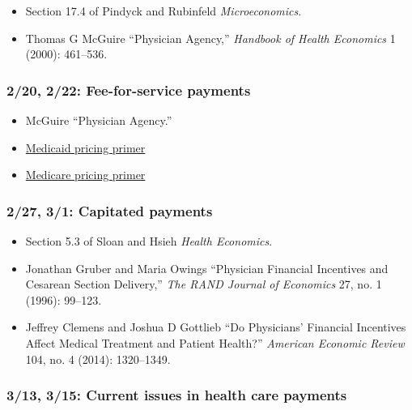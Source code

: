 \documentclass[11pt,]{article}
\providecommand{\tightlist}{%
  \setlength{\itemsep}{0pt}\setlength{\parskip}{0pt}}
\begin{document}
\begin{itemize}
\tightlist
\item
  Section 17.4 of Pindyck and Rubinfeld \emph{Microeconomics}.
\item
  Thomas G McGuire {``Physician Agency,''} \emph{Handbook of Health
  Economics} 1 (2000): 461--536.
\end{itemize}

\hypertarget{fee-for-service-payments}{%
\subsubsection{2/20, 2/22: Fee-for-service
payments}\label{fee-for-service-payments}}

\begin{itemize}
\tightlist
\item
  McGuire {``Physician Agency.''}
\item
  \href{https://www.macpac.gov/medicaid-101/}{Medicaid pricing primer}
\item
  \href{https://fas.org/sgp/crs/misc/R40425.pdf}{Medicare pricing
  primer}
\end{itemize}

\hypertarget{capitated-payments}{%
\subsubsection{2/27, 3/1: Capitated payments}\label{capitated-payments}}

\begin{itemize}
\tightlist
\item
  Section 5.3 of Sloan and Hsieh \emph{Health Economics}.
\item
  Jonathan Gruber and Maria Owings {``Physician Financial Incentives and
  Cesarean Section Delivery,''} \emph{The RAND Journal of Economics} 27,
  no. 1 (1996): 99--123.
\item
  Jeffrey Clemens and Joshua D Gottlieb {``Do {Physicians}' {Financial}
  {Incentives} {Affect} {Medical} {Treatment} and {Patient} {Health}?''}
  \emph{American Economic Review} 104, no. 4 (2014): 1320--1349.
\end{itemize}

\hypertarget{current-issues-in-health-care-payments}{%
\subsubsection{3/13, 3/15: Current issues in health care
payments}\label{current-issues-in-health-care-payments}}
\end{document}
